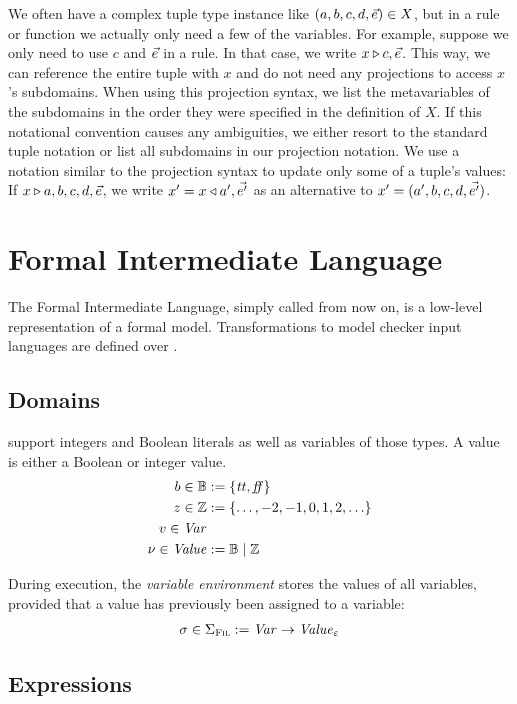 \documentclass[a4paper,10pt,english]{article}
\begin{document}
	We often have a complex tuple type instance like $(a, b, c, d, \vec{e}) \in X$, but in a rule or
	function we actually only need a few of the variables. For example, suppose we only need to use $c$ and $\vec{e}$ in a rule. In that case,
	we write $x \triangleright c, \vec{e}$.
	This way, we can reference the entire tuple with $x$ and do not need any projections to access $x$'s subdomains. When using this projection syntax, we list the
	metavariables of the subdomains in the order they were specified in the definition of $X$. If this notational convention causes any ambiguities, we either
	resort to the standard tuple notation or list all subdomains in our projection notation. We use a notation similar to the
	projection syntax to update only some of a tuple's values: If $x \triangleright a, b, c, d, \vec{e}$, we write $x' = x
	\triangleleft a', \vec{e'}$ as an alternative to $x' = (a', b, c, d, \vec{e'})$.  

\section{Formal Intermediate Language}
The Formal Intermediate Language, simply called \Fil from now on, is a low-level representation of a formal model. Transformations
to model checker input languages are defined over \Fil.
\subsection{Domains}

\Fil support integers and Boolean literals as well as variables of those types. A value is either a Boolean or integer
value.
\begin{align*}
    b \in \mathbb{B} &:= \{ \mathit{tt}, \mathit{ff} \}
    \\
    z \in \mathbb{Z} &:= \{ \ldots, -2, -1, 0, 1, 2, \ldots \}
    \\
    v \in \mathit{Var}
    \\
    \nu \in \mathit{Value} &:= \mathbb{B} \mid \mathbb{Z}
\end{align*}

During execution, the \textit{variable environment} stores the values of all variables, provided that a value has previously been
assigned to a variable:
\begin{align*}
	\sigma \in \Sigma_\textsc{Fil} := \mathit{Var} \rightarrow \mathit{Value}_\varepsilon
\end{align*}

\subsection{Expressions}
\end{document}
